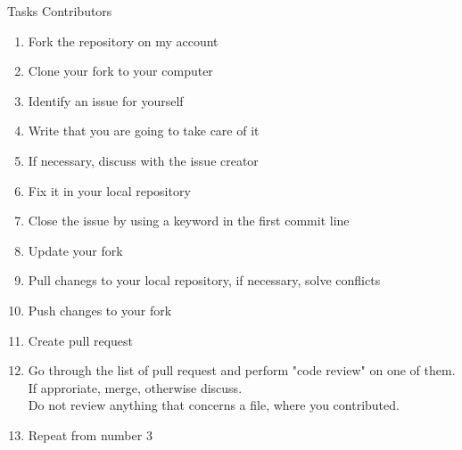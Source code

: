 \begin{frame}{Tasks Contributors}
\footnotesize

\begin{enumerate}
 \item Fork the repository on my account
 \item Clone your fork to your computer
 \item Identify an issue for yourself
 \item Write that you are going to take care of it
 \item If necessary, discuss with the issue creator
 \item Fix it in your local repository
 \item Close the issue by using a keyword in the first commit line
 \item Update your fork
 \item Pull chanegs to your local repository, if necessary, solve conflicts
 \item Push changes to your fork
 \item Create pull request
 \item Go through the list of pull request and perform "code review" on one of them.\\
       If approriate, merge, otherwise discuss.\\
       Do not review anything that concerns a file, where you contributed.
 \item Repeat from number 3
\end{enumerate}

\end{frame}
